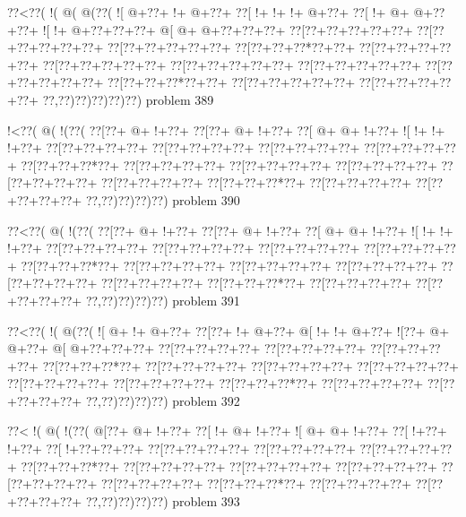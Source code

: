 \vbox{\vbox{\goo
\0??<\0??(\- !(\- @(\- @(\0??(
\- ![\- @+\0??+\- !+\- @+\0??+
\0??[\- !+\- !+\- !+\- @+\0??+
\0??[\- !+\- @+\- @+\0??+\0??+
\- ![\- !+\- @+\0??+\0??+\0??+
\- @[\- @+\- @+\0??+\0??+\0??+
\0??[\0??+\0??+\0??+\0??+\0??+
\0??[\0??+\0??+\0??+\0??+\0??+
\0??[\0??+\0??+\0??+\0??+\0??+
\0??[\0??+\0??+\0??*\0??+\0??+
\0??[\0??+\0??+\0??+\0??+\0??+
\0??[\0??+\0??+\0??+\0??+\0??+
\0??[\0??+\0??+\0??+\0??+\0??+
\0??[\0??+\0??+\0??+\0??+\0??+
\0??[\0??+\0??+\0??+\0??+\0??+
\0??[\0??+\0??+\0??*\0??+\0??+
\0??[\0??+\0??+\0??+\0??+\0??+
\0??[\0??+\0??+\0??+\0??+\0??+
\0??,\0??)\0??)\0??)\0??)\0??)
}
\hfil problem 389\hfil\break
}

\vbox{\vbox{\goo
\- !<\0??(\- @(\- !(\0??(
\0??[\0??+\- @+\- !+\0??+
\0??[\0??+\- @+\- !+\0??+
\0??[\- @+\- @+\- !+\0??+
\- ![\- !+\- !+\- !+\0??+
\0??[\0??+\0??+\0??+\0??+
\0??[\0??+\0??+\0??+\0??+
\0??[\0??+\0??+\0??+\0??+
\0??[\0??+\0??+\0??+\0??+
\0??[\0??+\0??+\0??*\0??+
\0??[\0??+\0??+\0??+\0??+
\0??[\0??+\0??+\0??+\0??+
\0??[\0??+\0??+\0??+\0??+
\0??[\0??+\0??+\0??+\0??+
\0??[\0??+\0??+\0??+\0??+
\0??[\0??+\0??+\0??*\0??+
\0??[\0??+\0??+\0??+\0??+
\0??[\0??+\0??+\0??+\0??+
\0??,\0??)\0??)\0??)\0??)
}
\hfil problem 390\hfil\break
}

\vbox{\vbox{\goo
\0??<\0??(\- @(\- !(\0??(
\0??[\0??+\- @+\- !+\0??+
\0??[\0??+\- @+\- !+\0??+
\0??[\- @+\- @+\- !+\0??+
\- ![\- !+\- !+\- !+\0??+
\0??[\0??+\0??+\0??+\0??+
\0??[\0??+\0??+\0??+\0??+
\0??[\0??+\0??+\0??+\0??+
\0??[\0??+\0??+\0??+\0??+
\0??[\0??+\0??+\0??*\0??+
\0??[\0??+\0??+\0??+\0??+
\0??[\0??+\0??+\0??+\0??+
\0??[\0??+\0??+\0??+\0??+
\0??[\0??+\0??+\0??+\0??+
\0??[\0??+\0??+\0??+\0??+
\0??[\0??+\0??+\0??*\0??+
\0??[\0??+\0??+\0??+\0??+
\0??[\0??+\0??+\0??+\0??+
\0??,\0??)\0??)\0??)\0??)
}
\hfil problem 391\hfil\break
}

\vbox{\vbox{\goo
\0??<\0??(\- !(\- @(\0??(
\- ![\- @+\- !+\- @+\0??+
\0??[\0??+\- !+\- @+\0??+
\- @[\- !+\- !+\- @+\0??+
\- ![\0??+\- @+\- @+\0??+
\- @[\- @+\0??+\0??+\0??+
\0??[\0??+\0??+\0??+\0??+
\0??[\0??+\0??+\0??+\0??+
\0??[\0??+\0??+\0??+\0??+
\0??[\0??+\0??+\0??*\0??+
\0??[\0??+\0??+\0??+\0??+
\0??[\0??+\0??+\0??+\0??+
\0??[\0??+\0??+\0??+\0??+
\0??[\0??+\0??+\0??+\0??+
\0??[\0??+\0??+\0??+\0??+
\0??[\0??+\0??+\0??*\0??+
\0??[\0??+\0??+\0??+\0??+
\0??[\0??+\0??+\0??+\0??+
\0??,\0??)\0??)\0??)\0??)
}
\hfil problem 392\hfil\break
}

\vbox{\vbox{\goo
\0??<\- !(\- @(\- !(\0??(
\- @[\0??+\- @+\- !+\0??+
\0??[\- !+\- @+\- !+\0??+
\- ![\- @+\- @+\- !+\0??+
\0??[\- !+\0??+\- !+\0??+
\0??[\- !+\0??+\0??+\0??+
\0??[\0??+\0??+\0??+\0??+
\0??[\0??+\0??+\0??+\0??+
\0??[\0??+\0??+\0??+\0??+
\0??[\0??+\0??+\0??*\0??+
\0??[\0??+\0??+\0??+\0??+
\0??[\0??+\0??+\0??+\0??+
\0??[\0??+\0??+\0??+\0??+
\0??[\0??+\0??+\0??+\0??+
\0??[\0??+\0??+\0??+\0??+
\0??[\0??+\0??+\0??*\0??+
\0??[\0??+\0??+\0??+\0??+
\0??[\0??+\0??+\0??+\0??+
\0??,\0??)\0??)\0??)\0??)
}
\hfil problem 393\hfil\break
}

